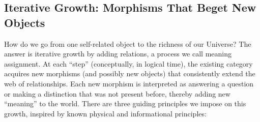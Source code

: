 \documentclass{article}
\begin{document}
\subsection{Iterative Growth: Morphisms That Beget New Objects}

How do we go from one self-related object to the richness of our Universe? The answer is iterative growth by adding relations, a process we call meaning assignment. At each “step” (conceptually, in logical time), the existing category acquires new morphisms (and possibly new objects) that consistently extend the web of relationships. Each new morphism is interpreted as answering a question or making a distinction that was not present before, thereby adding new “meaning” to the world. There are three guiding principles we impose on this growth, inspired by known physical and informational principles:
\end{document}
